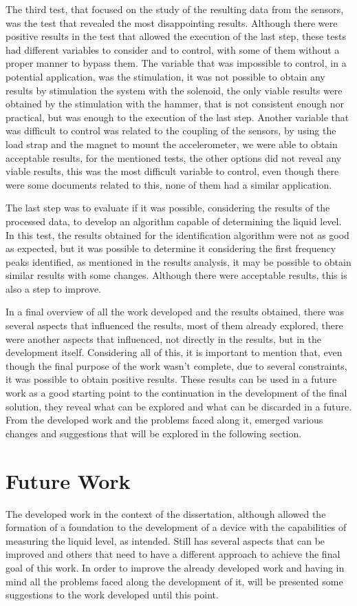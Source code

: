 The third test, that focused on the study of the resulting data from the sensors, was the test that revealed the most disappointing results. Although there were positive results in the test that allowed the execution of the last step, these tests had different variables to consider and to control, with some of them without a proper manner to bypass them. The variable that was impossible to control, in a potential application, was the stimulation, it was not possible to obtain any results by stimulation the system with the solenoid, the only viable results were obtained by the stimulation with the hammer, that is not consistent enough nor practical, but was enough to the execution of the last step. Another variable that was difficult to control was related to the coupling of the sensors, by using the load strap and the magnet to mount the accelerometer, we were able to obtain acceptable results, for the mentioned tests, the other options did not reveal any viable results, this was the most difficult variable to control, even though there were some documents related to this, none of them had a similar application. 

The last step was to evaluate if it was possible, considering the results of the processed data, to develop an algorithm capable of determining the liquid level. In this test, the results obtained for the identification algorithm were not as good as expected, but it was possible to determine it considering the first frequency peaks identified, as mentioned in the results analysis, it may be possible to obtain similar results with some changes. Although there were acceptable results, this is also a step to improve.

In a final overview of all the work developed and the results obtained, there was several aspects that influenced the results, most of them already explored, there were another aspects that influenced, not directly in the results, but in the development itself. Considering all of this, it is important to mention that, even though the final purpose of the work wasn't complete, due to several constraints, it was possible to obtain positive results. These results can be used in a future work as a good starting point to the continuation in the development of the final solution, they reveal what can be explored and what can be discarded in a future. From the developed work and the problems faced along it, emerged various changes and suggestions that will be explored in the following section. 
\section{Future Work}
The developed work in the context of the dissertation, although allowed the formation of a foundation to the development of a device with the capabilities of measuring the liquid level, as intended. Still has several aspects that can be improved and others that need to have a different approach to achieve the final goal of this work. In order to improve the already developed work and having in mind all the problems faced along the development of it, will be presented some suggestions to the work developed until this point. 

